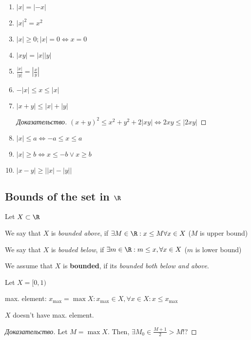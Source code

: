 \begin{property}[]
	\begin{enumerate}
		\item $|x| = |-x|$
		\item $|x|^2 = x^2$ 
		\item $|x| \geq 0; |x| = 0 \Leftrightarrow x = 0$ 
		\item $|xy| = |x||y|$
		\item $\frac{|x|}{|y|} = \left| \frac{x}{y} \right|$ 
		\item $-|x| \leq x \leq |x|$ 
		\item $|x+y| \leq |x| + |y|$ 
			\begin{proof}[Доказательство]
				$(x+y)^2 \leq x^2 + y^2 + 2|xy| \Leftrightarrow 2xy \leq |2xy|$
			\end{proof}
		\item $|x| \leq a \Leftrightarrow -a \leq x \leq a$
		\item $|x| \geq b \Leftrightarrow x \leq -b \vee x \geq b$ 
		\item $|x-y| \geq \left| |x| - |y| \right| $ 
	\end{enumerate}
\end{property}

\subsection{Bounds of the set in $\R$}

Let $X \subset \R$ 
\begin{definition}[]
	We say that $X$ is \textit{bounded above}, if $\exists M \in \R: x \leq M \forall x \in X$ ($M$ is upper bound)

	We say that $X$ is \textit{bouded below}, if $\exists m \in \R: m \leq x, \forall x \in X$ ($m$ is lower bound)

	We assume that $X$ is \textbf{bounded}, if its \textit{bounded both below and above}.
\end{definition}

\begin{example}[]
	Let $X = [0, 1)$
\end{example}

\begin{definition}
	max. element: $x_{\max} = \max X: x_{\max} \in X, \forall x \in X: x \leq x_{\max}$
\end{definition}

\begin{note}[]
	$X$ doesn't have max. element.
	\begin{proof}[Доказательство]
		Let $M = \max X$. Then,  $\exists M_0 \in \frac{M+1}{2} > M !?$
	\end{proof}
\end{note}

